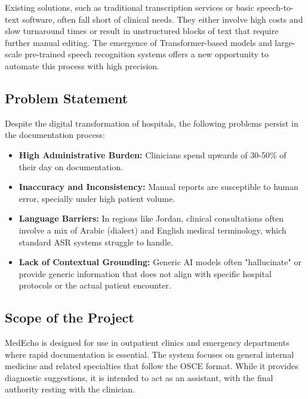 \documentclass[12pt,a4paper]{article}
\begin{document}
Existing solutions, such as traditional transcription services or basic speech-to-text software, often fall short of clinical needs. They either involve high costs and slow turnaround times or result in unstructured blocks of text that require further manual editing. The emergence of Transformer-based models and large-scale pre-trained speech recognition systems offers a new opportunity to automate this process with high precision.

\subsection{Problem Statement}
Despite the digital transformation of hospitals, the following problems persist in the documentation process:
\begin{itemize}
    \item \textbf{High Administrative Burden:} Clinicians spend upwards of 30-50\% of their day on documentation.
    \item \textbf{Inaccuracy and Inconsistency:} Manual reports are susceptible to human error, specially under high patient volume.
    \item \textbf{Language Barriers:} In regions like Jordan, clinical consultations often involve a mix of Arabic (dialect) and English medical terminology, which standard ASR systems struggle to handle.
    \item \textbf{Lack of Contextual Grounding:} Generic AI models often "hallucinate" or provide generic information that does not align with specific hospital protocols or the actual patient encounter.
\end{itemize}

\subsection{Scope of the Project}
MedEcho is designed for use in outpatient clinics and emergency departments where rapid documentation is essential. The system focuses on general internal medicine and related specialties that follow the OSCE format. While it provides diagnostic suggestions, it is intended to act as an assistant, with the final authority resting with the clinician.
\end{document}
